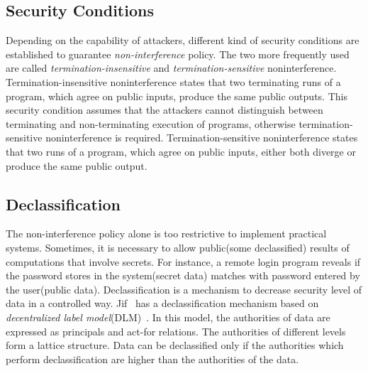 \documentclass{report}
\begin{document}
\subsection{Security Conditions}
Depending on the capability of attackers, different kind of security conditions
are established to guarantee {\it non-interference} policy.
The two more frequently used are called {\it termination-insensitive} and
{\it termination-sensitive} noninterference.
Termination-insensitive noninterference states that two terminating runs of a program,
which agree on public inputs, produce the same public outputs.
This security condition assumes that the attackers cannot distinguish between
terminating and non-terminating execution of programs, otherwise 
termination-sensitive noninterference is required.
Termination-sensitive noninterference states that two runs of a program, which agree on 
public inputs, either both diverge or produce the same public output.

\subsection{Declassification}
The non-interference policy alone is too restrictive to implement
practical systems. Sometimes, it is necessary to allow public(some declassified) results
of computations that involve secrets. For instance, a remote login program 
reveals if the password stores in the system(secret data) matches with
password entered by the user(public data).
Declassification is a mechanism to decrease security
level of data in a controlled way.
Jif~\cite{jif} has a declassification mechanism based on 
{\em decentralized label model}(DLM)~\cite{Myers:Liskov:TSEM2000}.
In this model, the authorities of data are expressed as principals and act-for relations.
The authorities of different levels form a lattice structure.
Data can be declassified only if the authorities which perform declassification
are higher than the authorities of the data.
\end{document}
